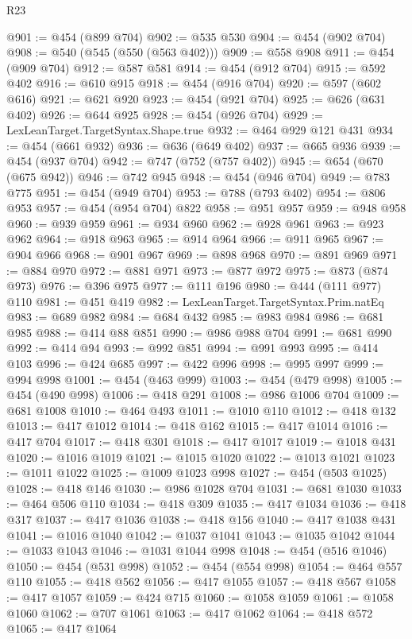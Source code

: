 \begin{lexlean}{R23}
\begin{coremodule}
@901 := @454 (@899 @704)
@902 := @535 @530
@904 := @454 (@902 @704)
@908 := @540 (@545 (@550 (@563 @402)))
@909 := @558 @908
@911 := @454 (@909 @704)
@912 := @587 @581
@914 := @454 (@912 @704)
@915 := @592 @402
@916 := @610 @915
@918 := @454 (@916 @704)
@920 := @597 (@602 @616)
@921 := @621 @920
@923 := @454 (@921 @704)
@925 := @626 (@631 @402)
@926 := @644 @925
@928 := @454 (@926 @704)
@929 := LexLeanTarget.TargetSyntax.Shape.true
@932 := @464 @929 @121 @431
@934 := @454 (@661 @932)
@936 := @636 (@649 @402)
@937 := @665 @936
@939 := @454 (@937 @704)
@942 := @747 (@752 (@757 @402))
@945 := @654 (@670 (@675 @942))
@946 := @742 @945
@948 := @454 (@946 @704)
@949 := @783 @775
@951 := @454 (@949 @704)
@953 := @788 (@793 @402)
@954 := @806 @953
@957 := @454 (@954 @704) @822
@958 := @951 @957
@959 := @948 @958
@960 := @939 @959
@961 := @934 @960
@962 := @928 @961
@963 := @923 @962
@964 := @918 @963
@965 := @914 @964
@966 := @911 @965
@967 := @904 @966
@968 := @901 @967
@969 := @898 @968
@970 := @891 @969
@971 := @884 @970
@972 := @881 @971
@973 := @877 @972
@975 := @873 (@874 @973)
@976 := @396 @975
@977 := @111 @196
@980 := @444 (@111 @977) @110
@981 := @451 @419
@982 := LexLeanTarget.TargetSyntax.Prim.natEq
@983 := @689 @982
@984 := @684 @432
@985 := @983 @984
@986 := @681 @985
@988 := @414 @88 @851
@990 := @986 @988 @704
@991 := @681 @990
@992 := @414 @94
@993 := @992 @851
@994 := @991 @993
@995 := @414 @103
@996 := @424 @685
@997 := @422 @996
@998 := @995 @997
@999 := @994 @998
@1001 := @454 (@463 @999)
@1003 := @454 (@479 @998)
@1005 := @454 (@490 @998)
@1006 := @418 @291
@1008 := @986 @1006 @704
@1009 := @681 @1008
@1010 := @464 @493
@1011 := @1010 @110
@1012 := @418 @132
@1013 := @417 @1012
@1014 := @418 @162
@1015 := @417 @1014
@1016 := @417 @704
@1017 := @418 @301
@1018 := @417 @1017
@1019 := @1018 @431
@1020 := @1016 @1019
@1021 := @1015 @1020
@1022 := @1013 @1021
@1023 := @1011 @1022
@1025 := @1009 @1023 @998
@1027 := @454 (@503 @1025)
@1028 := @418 @146
@1030 := @986 @1028 @704
@1031 := @681 @1030
@1033 := @464 @506 @110
@1034 := @418 @309
@1035 := @417 @1034
@1036 := @418 @317
@1037 := @417 @1036
@1038 := @418 @156
@1040 := @417 @1038 @431
@1041 := @1016 @1040
@1042 := @1037 @1041
@1043 := @1035 @1042
@1044 := @1033 @1043
@1046 := @1031 @1044 @998
@1048 := @454 (@516 @1046)
@1050 := @454 (@531 @998)
@1052 := @454 (@554 @998)
@1054 := @464 @557 @110
@1055 := @418 @562
@1056 := @417 @1055
@1057 := @418 @567
@1058 := @417 @1057
@1059 := @424 @715
@1060 := @1058 @1059
@1061 := @1058 @1060
@1062 := @707 @1061
@1063 := @417 @1062
@1064 := @418 @572
@1065 := @417 @1064

\end{coremodule}
\end{lexlean}
